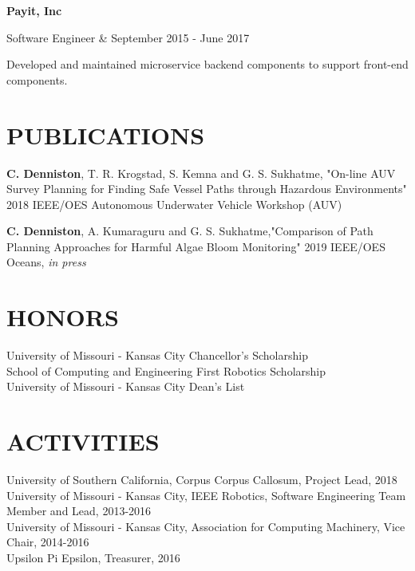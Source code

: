 \documentclass[margin,10pt]{res} %
\begin{document}
\begin{resume}
       {\bf Payit, Inc} \\
           \begin{ncolumn}{2}
           Software Engineer & September 2015 - June 2017
           \end{ncolumn}
           Developed and maintained microservice backend components to support front-end components.
          

\section{PUBLICATIONS}
{\bf C. Denniston}, T. R. Krogstad, S. Kemna and G. S. Sukhatme, "On-line AUV Survey Planning for Finding Safe Vessel Paths through Hazardous Environments" 2018 IEEE/OES Autonomous Underwater Vehicle Workshop (AUV)

{\bf C. Denniston}, A. Kumaraguru and G. S. Sukhatme,"Comparison of Path Planning Approaches for Harmful Algae Bloom
Monitoring" 2019 IEEE/OES Oceans, {\it in press}
\section{HONORS}
University of Missouri - Kansas City Chancellor's Scholarship \\
School of Computing and Engineering First Robotics Scholarship \\
University of Missouri - Kansas City Dean's List \\

\section{ACTIVITIES}
University of Southern California, Corpus Corpus Callosum, Project Lead, 2018 \\
University of Missouri - Kansas City, IEEE Robotics, Software Engineering Team Member and Lead, 2013-2016 \\
University of Missouri - Kansas City, Association for Computing Machinery, Vice Chair, 2014-2016\\
Upsilon Pi Epsilon, Treasurer, 2016

\end{resume}
\end{document}
